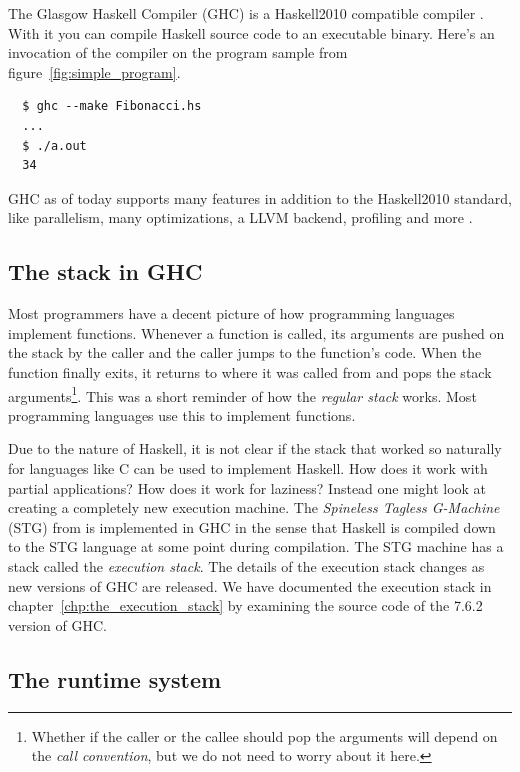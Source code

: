 The Glasgow Haskell Compiler (GHC) is a Haskell2010 compatible compiler
\cite{ghc_website}. With it you can compile Haskell source code to an executable
binary. Here's an invocation of the compiler on the program sample from figure~\ref{fig:simple_program}.

\begin{verbatim}
  $ ghc --make Fibonacci.hs
  ...
  $ ./a.out
  34
\end{verbatim}

GHC as of today supports many features in addition to the Haskell2010
standard, like parallelism, many optimizations, a LLVM backend, profiling
and more \cite{ghc_website}.

\subsection{The stack in GHC} \label{sec:stack_in_GHC}

Most programmers have a decent picture of how programming languages
implement functions. Whenever a function is called, its arguments are
pushed on the stack by the caller and the caller jumps to the function's
code. When the function finally exits, it returns to where it was called
from and pops the stack arguments\footnote{Whether if the caller or the callee
should pop the arguments will depend on the \emph{call convention}, but
we do not need to worry about it here.}.  This was a short reminder of how
the \emph{regular stack} works. Most programming languages use this to
implement functions.

Due to the nature of Haskell, it is not clear if the stack that worked
so naturally for languages like C can be used to implement Haskell.
How does it work with partial applications? How does it work for
laziness? Instead one might look at creating a completely new execution
machine. The \emph{Spineless Tagless G-Machine} (STG) from
\cite{stg_1992} is implemented in GHC \cite{evalapplyjfp06} in the sense
that Haskell is compiled down to the STG language at some point during compilation.
The STG machine has a stack called the \emph{execution stack}. The details
of the execution stack changes as new versions of GHC are released.
We have documented the execution stack in chapter~\ref{chp:the_execution_stack} by examining the source code of
the 7.6.2 version of GHC.

\subsection{The runtime system}

